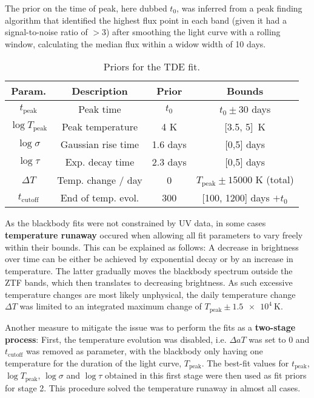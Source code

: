 The prior on the time of peak, here dubbed $t_0$, was inferred from a peak finding algorithm that identified the highest flux point in each band (given it had a signal-to-noise ratio of $>3$) after smoothing the light curve with a rolling window, calculating the median flux within a widow width of 10 days.

\begin{table}[h]
  \begin{center}
    \begin{tabular}{c c c c}
      \hline
      \textbf{Param.}      & \textbf{Description} & \textbf{Prior} & \textbf{Bounds}                     \\
      \hline
      \hline
      $t_\text{peak}$      & Peak time            & $t_0$          & $t­_0 \pm 30$ days                  \\
      $\log T_\text{peak}$ & Peak temperature     & 4 K            & [3.5, 5]~\unit{\K}                  \\
      $\log \sigma$        & Gaussian rise time   & 1.6 days       & [0,5] days                          \\
      $\log \tau$          & Exp. decay time      & 2.3 days       & [0,5] days                          \\
      $\Delta T$           & Temp. change / day   & 0              & $T_\text{peak} \pm 15000$ K (total) \\
      $t_\text{cutoff}$    & End of temp. evol.   & 300            & [100, 1200] days $+t_0$             \\
      \hline
    \end{tabular}
  \end{center}
  \caption[TDE Fit priors]{Priors for the TDE fit.}\label{tab:tde_fit_priors}
\end{table}

As the blackbody fits were not constrained by UV data, in some cases \textbf{temperature runaway} occured when allowing all fit parameters to vary freely within their bounds. This can be explained as follows: A decrease in brightness over time can be either be achieved by exponential decay or by an increase in temperature. The latter gradually moves the blackbody spectrum outside the ZTF bands, which then translates to decreasing brightness. As such excessive temperature changes are most likely unphysical, the daily temperature change $\Delta T$ was limited to an integrated maximum change of $T_\text{peak} \pm \SI{1.5e4}{\K}$.

Another measure to mitigate the issue was to perform the fits as a \textbf{two-stage process}: First, the temperature evolution was disabled, i.e. $\Delta aT$ was set to $0$ and $t_\text{cutoff}$ was removed as parameter, with the blackbody only having one temperature for the duration of the light curve, $T_\text{peak}$. The best-fit values for $t_\text{peak}$, $\log T­­_\text{peak}$, $\log \sigma$ and $\log \tau$ obtained in this first stage were then used as fit priors for stage 2. This procedure solved the temperature runaway in almost all cases.

